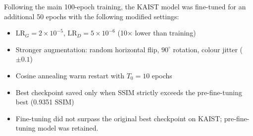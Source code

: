 Following the main 100-epoch training, the KAIST model was fine-tuned for an additional 50 epochs with the following modified settings:

\begin{itemize}
    \item $\text{LR}_G = 2 \times 10^{-5}$, $\text{LR}_D = 5 \times 10^{-6}$ (10$\times$ lower than training)
    \item Stronger augmentation: random horizontal flip, $90^\circ$ rotation, colour jitter ($\pm0.1$)
    \item Cosine annealing warm restart with $T_0 = 10$ epochs
    \item Best checkpoint saved only when SSIM strictly exceeds the pre-fine-tuning best (0.9351 SSIM)
    \item Fine-tuning did not surpass the original best checkpoint on KAIST; pre-fine-tuning model was retained.
\end{itemize}
